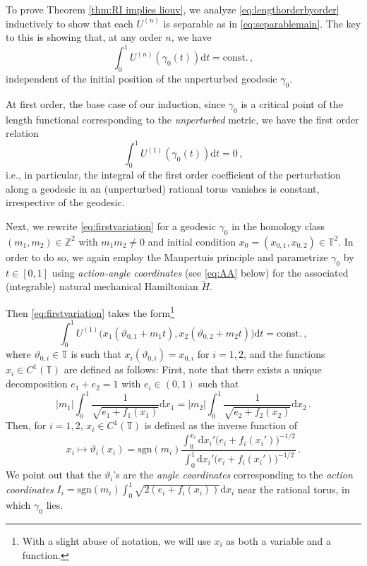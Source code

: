 \documentclass[11pt,letterpaper,oneside]{amsart}
\newcommand{\Z}{\mathbb{Z}}
\newcommand{\T}{\mathbb{T}}
\renewcommand{\theta}{\vartheta}
\theoremstyle{definition}
\theoremstyle{remark}
\newcommand{\const}{\text{const.}}
\theoremstyle{definition}
\theoremstyle{remark}
\newcommand{\dif}{\mathrm{d}}
\begin{document}
To prove Theorem \ref{thm:RI implies liouv}, we analyze \eqref{eq:lengthorderbyorder} inductively to show that each $U^{(n)}$ is separable as in \eqref{eq:separablemain}. The key to this is showing that, at any order $n$,  we have
\begin{equation}
    \int_{0}^{1} U^{(n)}(\gamma_0(t)) \dif t = \const \,, 
\end{equation}
 independent of the initial position of the unperturbed geodesic $\gamma_0$. 

\medskip

At first order, the base case of our induction, since $\gamma_0$ is a critical point of the length functional corresponding to the \emph{unperturbed} metric, we have the first order relation
\begin{equation} \label{eq:firstvariation}
    \int_0^1 U^{(1)}(\gamma_0(t)) \dif t  = 0 \,, 
\end{equation}
i.e., in particular, the integral of the first order coefficient of the perturbation along a geodesic in an (unperturbed) rational torus vanishes is constant, irrespective of the geodesic.

\medskip

Next, we rewrite \eqref{eq:firstvariation} for a geodesic $\gamma_0$ in the homology class $(m_1,m_2) \in \Z^2$ with $m_1 m_2\neq 0$ and initial condition $x_0 = (x_{0,1},x_{0,2}) \in \T^2$. In order to do so, we again employ the Maupertuis principle and parametrize $\gamma_0$ by $t \in [0,1]$ using \emph{action-angle coordinates} (see \eqref{eq:AA} below) for the associated (integrable) natural mechanical Hamiltonian $\widetilde{H}$. 

\medskip

Then \eqref{eq:firstvariation} takes the form\footnote{With a slight abuse of notation, we will use $x_i$ as both a variable and a function.} 
\begin{equation} \label{eq:firstvariationcanon}
    \int_0^1 U^{(1)}\big(x_1(\theta_{0,1} + m_1t), x_2(\theta_{0,2} + m_2t) \big) \dif t = \const \,, 
\end{equation}
where $\theta_{0,i} \in \T$ is such that $x_i(\theta_{0,i}) = x_{0,i}$ for $i=1,2$, and the functions $x_i \in C^1(\T)$ are defined as follows: First, note that there exists a unique decomposition $e_1 + e_2 = 1$ with $e_i \in (0,1)$ such that 
\begin{equation} \label{eq:length}
    |m_1| \int_{0}^{1} \frac{1}{\sqrt{e_1 + f_1(x_1)}} 		\mathrm{d} x_1 = |m_2| \int_{0}^{1} \frac{1}{\sqrt{e_2+ f_2(x_2)}} 		\mathrm{d} x_2 \,. 
\end{equation}
Then, for $i=1,2$, $x_i \in C^1(\T)$ is defined as the inverse function of
\begin{equation} \label{eq:AA}
    x_i \mapsto \theta_i(x_i) = \mathrm{sgn}(m_i) \frac{\int_0^{x_i} \dif x_i'\big(e_i + f_i(x_i')\big)^{-1/2} }{\int_0^{1} \dif x_i'\big(e_i + f_i(x_i')\big)^{-1/2}} \,. 
\end{equation}
We point out that the $\theta_i$'s are the \emph{angle coordinates} corresponding to the \emph{action coordinates} $I_i = \mathrm{sgn}(m_i) \int_0^1 \sqrt{2(e_i + f_i(x_i))} \dif x_i $ near the rational torus, in which $\gamma_0$ lies. 
\end{document}
